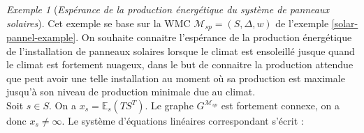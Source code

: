 \documentclass[12pt,a4paper]{report}
\theoremstyle{definition}%
\theoremstyle{remark}
\newtheorem{example}{Exemple}[chapter]
\begin{document}
\begin{example}[\textit{Espérance de la production énergétique du système de panneaux solaires}]
	Cet exemple se base sur la WMC $\mathcal{M}_{sp} = (S, \Delta, w)$ de l'exemple \ref{solar-pannel-example}. On souhaite connaitre l'espérance de la production énergétique de l'installation de panneaux solaires lorsque le climat est ensoleillé jusque quand le climat est fortement nuageux, dans le but de connaitre la production attendue que peut avoir une telle installation au moment où sa production est maximale jusqu'à son niveau de production minimale due au climat.\\
	Soit $s \in S$. On a $x_s = \mathbb{E}_s(TS^T)$. Le graphe $G^{\mathcal{M}_{sp}}$ est fortement connexe, on a donc $x_s \neq \infty$. Le système d'équations linéaires correspondant s'écrit :


\end{example}
\end{document}
